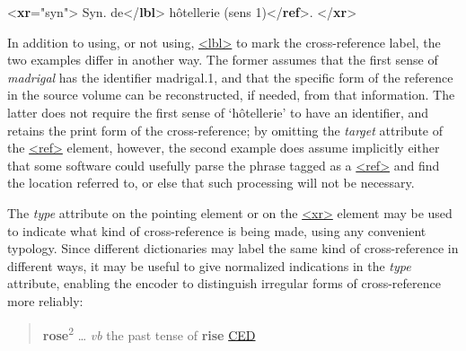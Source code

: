  \par\bgroup{}\exampleFont \begin{shaded}\noindent\mbox{}{<\textbf{xr}\hspace*{1em}{type}="{syn}">}\mbox{}\newline 
{}Syn. de{</\textbf{lbl}>}\mbox{}\newline 
{}hôtellerie (sens 1){</\textbf{ref}>}.\mbox{}\newline 
{</\textbf{xr}>}\end{shaded}\egroup\par \noindent  In addition to using, or not using, \hyperref[TEI.lbl]{<lbl>} to mark the cross-reference label, the two examples differ in another way. The former assumes that the first sense of \textit{madrigal} has the identifier madrigal.1, and that the specific form of the reference in the source volume can be reconstructed, if needed, from that information. The latter does not require the first sense of ‘hôtellerie’ to have an identifier, and retains the print form of the cross-reference; by omitting the {\itshape target} attribute of the \hyperref[TEI.ref]{<ref>} element, however, the second example does assume implicitly either that some software could usefully parse the phrase tagged as a \hyperref[TEI.ref]{<ref>} and find the location referred to, or else that such processing will not be necessary.\par
The {\itshape type} attribute on the pointing element or on the \hyperref[TEI.xr]{<xr>} element may be used to indicate what kind of cross-reference is being made, using any convenient typology. Since different dictionaries may label the same kind of cross-reference in different ways, it may be useful to give normalized indications in the {\itshape type} attribute, enabling the encoder to distinguish irregular forms of cross-reference more reliably:
\begin{quote}{\bfseries rose}\textsuperscript{2} … {\itshape vb} the past tense of {\bfseries rise} \hyperref[DIC-CED]{CED}\end{quote}
